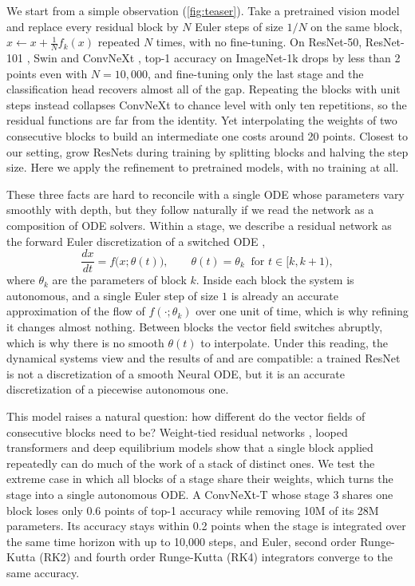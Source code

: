\documentclass{article}
\theoremstyle{plain}
\theoremstyle{definition}
\theoremstyle{remark}
\begin{document}
We start from a simple observation (\cref{fig:teaser}).
Take a pretrained vision model and replace every residual block by $N$ Euler steps of size $1/N$ on the same block,
$x \leftarrow x + \frac{1}{N} f_k(x)$ repeated $N$ times, with no fine-tuning.
On ResNet-50, ResNet-101 \citep{he2016resnet}, Swin \citep{liu2021swin} and ConvNeXt \citep{liu2022convnext},
top-1 accuracy on ImageNet-1k \citep{deng2009imagenet} drops by less than 2 points even with $N=10{,}000$,
and fine-tuning only the last stage and the classification head recovers almost all of the gap.
Repeating the blocks with unit steps instead collapses ConvNeXt to chance level with only ten repetitions,
so the residual functions are far from the identity.
Yet interpolating the weights of two consecutive blocks to build an intermediate one costs around 20 points.
Closest to our setting, \citet{chang2018multilevel} grow ResNets during training by splitting blocks
and halving the step size.
Here we apply the refinement to pretrained models, with no training at all.

These three facts are hard to reconcile with a single ODE whose parameters vary smoothly with depth,
but they follow naturally if we read the network as a composition of ODE solvers.
Within a stage, we describe a residual network as the forward Euler discretization of a switched ODE
\citep{liberzon2003switching},
\begin{equation}
\frac{dx}{dt} = f\big(x;\theta(t)\big), \qquad \theta(t) = \theta_k \ \text{ for } t \in [k, k+1),
\label{eq:switched}
\end{equation}
where $\theta_k$ are the parameters of block $k$.
Inside each block the system is autonomous, and a single Euler step of size $1$ is already an accurate approximation
of the flow of $f(\cdot;\theta_k)$ over one unit of time, which is why refining it changes almost nothing.
Between blocks the vector field switches abruptly, which is why there is no smooth $\theta(t)$ to interpolate.
Under this reading, the dynamical systems view and the results of \citet{sander2022residualneuralnetworksdiscretize}
and \citet{cohen2021scaling} are compatible: a trained ResNet is not a discretization of a smooth Neural ODE,
but it is an accurate discretization of a piecewise autonomous one.

This model raises a natural question: how different do the vector fields of consecutive blocks need to be?
Weight-tied residual networks \citep{liao2016bridging, sharesnet}, looped transformers
\citep{dehghani2019universal, giannou2023looped} and deep equilibrium models \citep{bai2019deep}
show that a single block applied repeatedly can do much of the work of a stack of distinct ones.
We test the extreme case in which all blocks of a stage share their weights,
which turns the stage into a single autonomous ODE.
A ConvNeXt-T whose stage 3 shares one block loses only 0.6 points of top-1 accuracy
while removing 10M of its 28M parameters.
Its accuracy stays within 0.2 points when the stage is integrated over the same time horizon with up to 10,000 steps,
and Euler, second order Runge-Kutta (RK2) and fourth order Runge-Kutta (RK4) integrators converge to the same accuracy.
\end{document}
